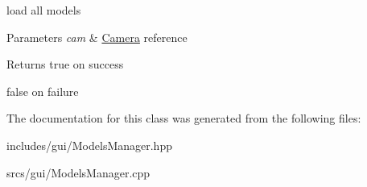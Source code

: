 load all models 


\begin{DoxyParams}{Parameters}
{\em cam} & \hyperlink{class_camera}{Camera} reference \\
\hline
\end{DoxyParams}
\begin{DoxyReturn}{Returns}
true on success 

false on failure 
\end{DoxyReturn}


The documentation for this class was generated from the following files\+:\begin{DoxyCompactItemize}
\item 
includes/gui/Models\+Manager.\+hpp\item 
srcs/gui/Models\+Manager.\+cpp\end{DoxyCompactItemize}
